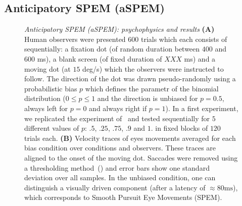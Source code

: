 \documentclass[profile,final,english, draft]{article}%
\newcommand{\ms}{\si{\milli\second}}%
\begin{document}
\subsection{Anticipatory SPEM (aSPEM)}
\begin{figure}%
\caption{\emph{Anticipatory SPEM (aSPEM): psychophysics and results} %
\textbf{(A)} Human observers were presented $600$ trials
which each consists of sequentially:
a fixation dot (of random duration between $400$ and $600$ \ms),
a blank screen (of fixed duration of  $XXX$ \ms) and
a moving dot (at $15$ deg/s) which the observers were instructed to follow. The direction of the dot was drawn pseudo-randomly using a probabilistic bias $p$ which defines the parametr of the binomial distribution
($0\leq p\leq 1 $ and the direction is unbiased for $p=0.5$,
always left for $p=0$ and always right if $p=1$).
In a first experiment, we replicated the experiment of~\parencite{Montagnini2010} and
tested sequentially for $5$ different values of $p$: $.5$, $.25$, $.75$, $.9$ and $1.$ in fixed blocks of $120$ trials each.
\textbf{(B)}
Velocity traces of eyes movements averaged for each bias condition
over conditions and observers.
These traces are aligned to the onset of the moving dot.
Saccades were removed using a thresholding method~() and
error bars show one standard deviation over all samples.
In the unbiased condition, one can distinguish a visually driven component (after a latency of $\approx 80 \ms$),
which corresponds to Smooth Pursuit Eye Movements (SPEM).
}
\end{figure}
\end{document}

